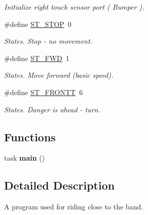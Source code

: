 \begin{DoxyCompactItemize}
\begin{DoxyCompactList}\small\item\em Initialize right touch sensor port ( Bumper ). \item\end{DoxyCompactList}\item 
\hypertarget{fence_8nxc_a8ccbe4f289c6182e18589c6f2c6108ee}{
\#define \hyperlink{fence_8nxc_a8ccbe4f289c6182e18589c6f2c6108ee}{ST\_\-STOP}~0}
\label{fence_8nxc_a8ccbe4f289c6182e18589c6f2c6108ee}

\begin{DoxyCompactList}\small\item\em States. Stop -\/ no movement. \item\end{DoxyCompactList}\item 
\hypertarget{fence_8nxc_abba849981e74e84eb3836d3c03c363a9}{
\#define \hyperlink{fence_8nxc_abba849981e74e84eb3836d3c03c363a9}{ST\_\-FWD}~1}
\label{fence_8nxc_abba849981e74e84eb3836d3c03c363a9}

\begin{DoxyCompactList}\small\item\em States. Move forward (basic speed). \item\end{DoxyCompactList}\item 
\hypertarget{fence_8nxc_a82671cbfd87d61e73ed46e39a25ea515}{
\#define \hyperlink{fence_8nxc_a82671cbfd87d61e73ed46e39a25ea515}{ST\_\-FRONTT}~6}
\label{fence_8nxc_a82671cbfd87d61e73ed46e39a25ea515}

\begin{DoxyCompactList}\small\item\em States. Danger is ahead -\/ turn. \item\end{DoxyCompactList}\end{DoxyCompactItemize}
\subsection*{Functions}
\begin{DoxyCompactItemize}
\item 
\hypertarget{fence_8nxc_a9a2af8e2cd81255d3bf384db4a382807}{
task {\bfseries main} ()}
\label{fence_8nxc_a9a2af8e2cd81255d3bf384db4a382807}

\end{DoxyCompactItemize}


\subsection{Detailed Description}
A program used for riding close to the band. 
